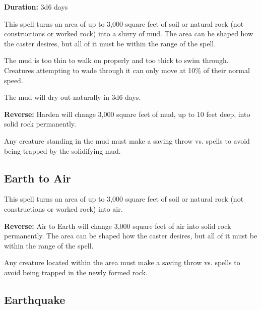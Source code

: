 \begin{multicols*}{2}
{\textbf{Duration:} 3d6 days}

This spell turns an area of up to 3,000 square feet of soil or natural rock (not constructions or worked rock) into a slurry of mud. The area can be shaped how the caster desires, but all of it must be within the range of the spell.

The mud is too thin to walk on properly and too thick to swim through. Creatures attempting to wade through it can only move at 10\% of their normal speed.

The mud will dry out naturally in 3d6 days.

\textbf{Reverse:} \hypertarget{spell:Harden}{Harden} will change 3,000 square feet of mud, up to 10 feet deep, into solid rock permanently.

Any creature standing in the mud must make a saving throw vs. spells to avoid being trapped by the solidifying mud.

\subsection{Earth to Air}\label{spell:Earth to Air}

This spell turns an area of up to 3,000 square feet of soil or natural rock (not constructions or worked rock) into air.

\textbf{Reverse:} \hypertarget{spell:Air to Earth}{Air to Earth} will change 3,000 square feet of air into solid rock permanently. The area can be shaped how the caster desires, but all of it must be within the range of the spell.

Any creature located within the area must make a saving throw vs. spells to avoid being trapped in the newly formed rock.

\subsection{Earthquake}\label{spell:Earthquake}
\end{multicols*}
